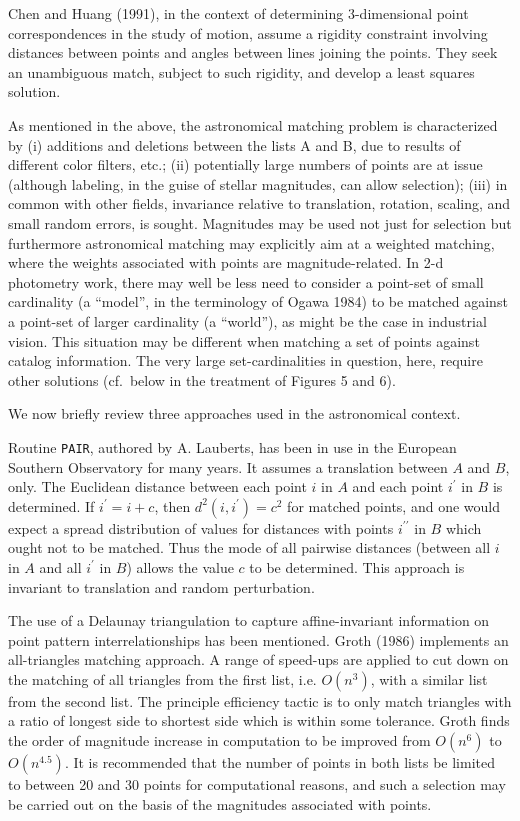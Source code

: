 Chen and Huang (1991), in the context of determining 3-dimensional
point correspondences in the study of motion, assume a rigidity constraint
involving distances between points and angles between lines joining the 
points.  They seek an unambiguous match, subject to such rigidity, and 
develop a least squares solution.

As mentioned in the above, the astronomical matching problem is
characterized by (i) additions and deletions between the lists A and B,
due to results of different color filters, etc.;
(ii) potentially large numbers of points are at issue (although labeling, 
in the guise
of stellar magnitudes, can allow selection); (iii) in common with other
fields, invariance relative to translation, rotation, scaling, and 
small random errors, is sought. Magnitudes may be used not just for selection
but furthermore  astronomical matching may explicitly aim at a weighted
matching, where the weights associated with points
are magnitude-related.  In 2-d photometry work, there may well be less 
need to consider
a point-set of small cardinality (a ``model'', in the terminology of 
Ogawa 1984) to be matched against a
point-set of larger cardinality (a ``world''), as might be the case in
industrial vision.  This situation may be different when 
matching a set of points against catalog 
information. The very large 
set-cardinalities in question, here, require other solutions (cf.\ below in the
treatment of Figures 5 and 6).

We now briefly review three approaches used in the astronomical context.

Routine {\tt PAIR}, authored by A. Lauberts, has been in use in the European
Southern Observatory for many years.  It assumes a translation between
$A$ and $B$, only.  
The Euclidean distance between each point $i$ in $A$ and each
point $i^{\prime}$ in $B$ is determined.  If $i^{\prime} = i + c$, then
$d^2(i,i^{\prime}) = c^2$ for matched points, and one would expect a 
spread distribution of values for distances with points $i^{\prime\prime}$ 
in $B$ which ought
not to be matched.  Thus the mode of all pairwise distances (between all $i$ in
$A$ and all $i^{\prime}$ in $B$) allows the value $c$ to be determined.  This
approach is invariant to translation and random perturbation.  

The use of a Delaunay triangulation to capture affine-invariant information
on point pattern interrelationships has been mentioned.  
Groth (1986) implements an all-triangles matching approach.  A range of
speed-ups are applied to cut down on the matching of all triangles from
the first list, i.e. $O(n^3)$, with a similar list from the second list.
The principle efficiency tactic is to only match triangles with a 
ratio of longest side to shortest side which is within some tolerance.  
Groth finds the order of magnitude increase in computation to be improved
from $O(n^6)$ to $O(n^{4.5})$.  It is recommended that the number of points
in both lists be limited to between 20 and 30 points for computational reasons,
and such a selection may be
carried out on the basis of the magnitudes associated with points.

